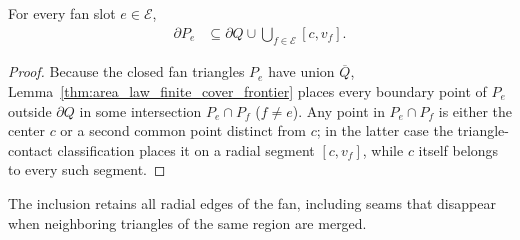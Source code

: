 \begin{lemma}
    \label{thm:area_law_fan_frontier_primitives}
    \leanok
    For every fan slot $e\in\mathcal E$,
    \begin{align}
        \partial P_e & \subseteq\partial Q\cup
        \bigcup_{f\in\mathcal E}[c,v_f].
    \end{align}
\end{lemma}
\begin{proof}\leanok
    Because the closed fan triangles $P_e$ have union $\overline Q$,
    Lemma~\ref{thm:area_law_finite_cover_frontier} places every boundary
    point of $P_e$ outside $\partial Q$ in some intersection $P_e\cap P_f$
    ($f\ne e$). Any point in $P_e\cap P_f$ is either the center $c$ or a
    second common point distinct from $c$; in the latter case the
    triangle-contact classification places it on a radial segment $[c,v_f]$,
    while $c$ itself belongs to every such segment.
\end{proof}

The inclusion retains all radial edges of the fan, including seams that
disappear when neighboring triangles of the same region are merged.

